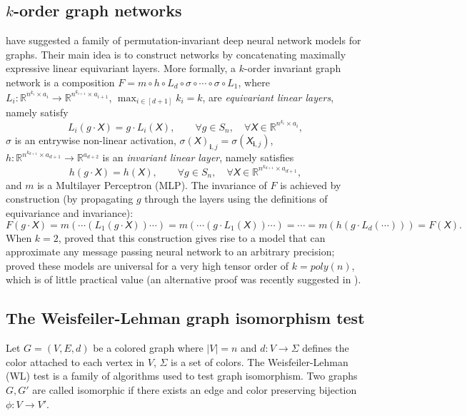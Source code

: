 \documentclass{article}
\newcommand{\Real}{\mathbb R}
\newcommand{\too}{\rightarrow}
\def\vi{{\bm{i}}}
\newcommand{\tens}[1]{\bm{\mathsfit{#1}}}
\def\tX{{\tens{X}}}
\begin{document}
\subsection{$k$-order graph networks}\label{ss:k_order_networks}
\vspace{-5pt}
\citet{maron2018invariant} have suggested a family of permutation-invariant deep neural network models for graphs. Their main idea is to construct networks by concatenating maximally expressive linear equivariant layers. More formally, a $k$-order invariant graph network is a composition $F=m\circ h \circ L_d \circ \sigma \circ \cdots \circ \sigma \circ L_1$, where $L_i:\Real^{n^{k_i}\times a_i} \too \Real^{n^{k_{i+1}} \times a_{i+1}}$, $\max_{i\in [d+1]} k_i = k$, are \emph{equivariant linear layers}, namely satisfy $$L_i(g\cdot \tX) = g\cdot L_i(\tX), \qquad \forall g\in S_n, \quad \forall \tX\in \Real^{n^{k_i}\times a_i},$$
$\sigma$ is an entrywise non-linear activation, $\sigma(\tX)_{\vi,j}=\sigma(\tX_{\vi,j})$, $h:\Real^{n^{k_{d+1}} \times a_{d+1}}\too \Real^{a_{d+2 }}$ is an \emph{invariant linear layer}, namely satisfies 
$$h(g\cdot \tX) = h(\tX), \qquad \forall g\in S_n, \quad \forall \tX\in \Real^{n^{k_{d+1}}\times a_{d+1}},$$
and $m$ is a Multilayer Perceptron (MLP). The invariance of $F$ is achieved by construction (by propagating $g$ through the layers using the definitions of equivariance and invariance):  $$F(g\cdot \tX)=m(  \cdots ( L_1(g\cdot \tX)) \cdots ) = m( \cdots ( g\cdot L_1( \tX)) \cdots )=\cdots=m(h(g\cdot L_d(\cdots)))=F(\tX).$$
When $k=2$, \citet{maron2018invariant} proved that this construction gives rise to a model that can approximate any message passing neural network \citep{Gilmer2017} to an arbitrary precision; \citet{maron2019universality} proved these models are universal for a very high tensor order of $k=poly(n)$, which is of little practical value (an alternative proof was recently suggested in \cite{keriven2019universal}).   




\vspace{-5pt}
\subsection{The Weisfeiler-Lehman graph isomorphism test}\label{ss:WL}
\vspace{-5pt}
Let $G=(V,E,d)$ be a colored graph where $|V|=n$ and $d:V\too \Sigma$ defines the color attached to each vertex in $V$, $\Sigma$ is a set of colors.  The Weisfeiler-Lehman (WL) test is a family of algorithms used to test graph isomorphism. Two graphs $G,G'$ are called isomorphic if there exists an edge and color preserving bijection $\phi:V\too V'$. 
\end{document}
